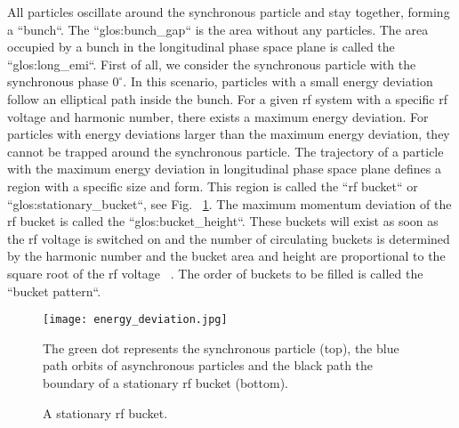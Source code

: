 All particles oscillate around the synchronous particle and stay together, forming a ``bunch``. The ``\gls{glos:bunch_gap}`` is the area without any particles. The area occupied by a bunch in the longitudinal phase space plane is called the ``\gls{glos:long_emi}``. First of all, we consider the synchronous particle with the synchronous phase $0^\circ$. In this scenario, particles with a small energy deviation follow an elliptical path inside the bunch. For a given rf system with a specific rf voltage and harmonic number, there exists a maximum energy deviation. For particles with energy deviations larger than the maximum energy deviation, they cannot be trapped around the synchronous particle. The trajectory of a particle with the maximum energy deviation in longitudinal phase space plane defines a region with a specific size and form. This region is called the ``rf bucket`` or ``\gls{glos:stationary_bucket}``, see Fig. ~\ref{energy_deviation}. The maximum momentum deviation of the rf bucket is called the ``\gls{glos:bucket_height}``. These buckets will exist as soon as the rf voltage is switched on and the number of circulating buckets is determined by the harmonic number and the bucket area and height are proportional to the square root of the rf voltage ~\cite{lee_accelerator_2011}. The order of buckets to be filled is called the ``bucket pattern``.
\begin{figure}[!htb]
   \centering   
   \texttt{[image: energy\_deviation.jpg]}
   \caption{A stationary rf bucket.}{The green dot represents the synchronous particle (top), the blue path orbits of asynchronous particles and the black path the boundary of a stationary rf bucket (bottom).}
   \label{energy_deviation}
\end{figure} 

